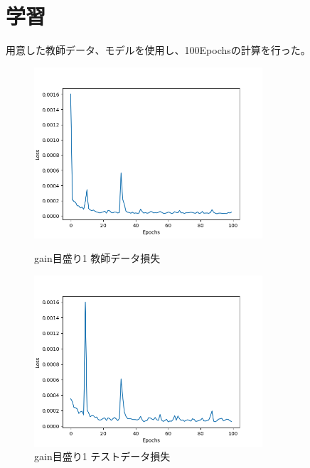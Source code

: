 \documentclass{jreport}		%
\begin{document}
\section{学習}
用意した教師データ、モデルを使用し、100Epochsの計算を行った。
\begin{figure}[htbp]
 \begin{minipage}{0.5\hsize}
  \begin{center}
   \includegraphics[width=85mm]{gain1_loss.png}
  \end{center}
  \caption{gain目盛り1 教師データ損失}
  \label{fig:one}
 \end{minipage}
 \begin{minipage}{0.5\hsize}
  \begin{center}
   \includegraphics[width=85mm]{gain1_val_loss.png}
  \end{center}
  \caption{gain目盛り1 テストデータ損失}
  \label{fig:two}
 \end{minipage}
\end{figure}
\end{document}

